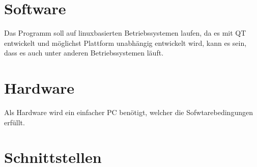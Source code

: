 \section{Software}
Das Programm soll auf linuxbasierten Betriebssystemen laufen, da es mit QT entwickelt und möglichst Plattform unabhängig entwickelt wird, kann es sein, dass es auch unter anderen Betriebssystemen läuft.
\section{Hardware}
Als Hardware wird ein einfacher PC benötigt, welcher die Sofwtarebedingungen erfüllt.  
\section{Schnittstellen}
